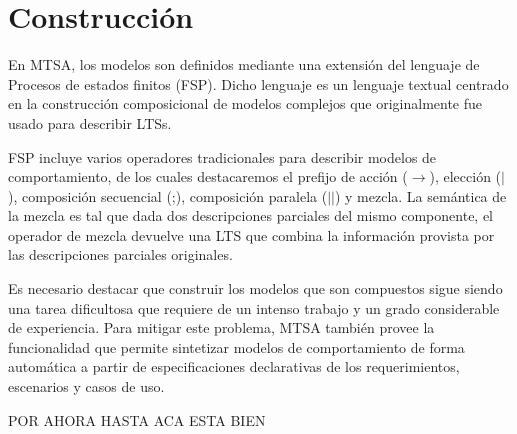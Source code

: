 \section{Construcción}

En MTSA, los modelos son definidos mediante una extensión del lenguaje de Procesos de estados finitos (FSP). Dicho
lenguaje es un lenguaje textual centrado en la construcción composicional de modelos complejos que originalmente fue
usado para describir LTSs.

FSP incluye varios operadores tradicionales para describir modelos de comportamiento, de los cuales destacaremos el
prefijo de acción ($\rightarrow$), elección ($|$), composición secuencial (;), composición paralela ($||$) y mezcla.
La semántica de la mezcla es tal que dada dos descripciones parciales del mismo componente, el operador de mezcla
devuelve una LTS que combina la información provista por las descripciones parciales originales.

Es necesario destacar que construir los modelos que son compuestos sigue siendo una tarea dificultosa que requiere de un
intenso trabajo y un grado considerable de experiencia. Para mitigar este problema, MTSA también provee la funcionalidad
que permite sintetizar modelos de comportamiento de forma automática a partir de especificaciones declarativas de los
requerimientos, escenarios y casos de uso.

 POR AHORA HASTA ACA ESTA BIEN
